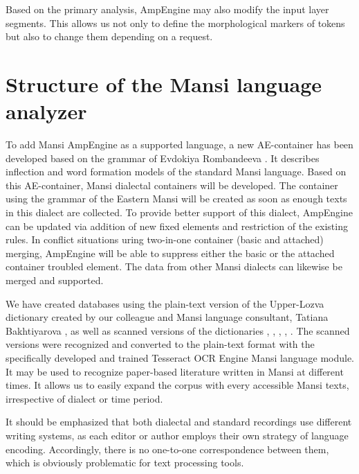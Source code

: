 \documentclass[b5paper,notitlepage]{article}
\begin{document}
Based on the primary analysis, AmpEngine may also modify the input layer segments. This allows us not only to define the morphological markers of tokens but also to change them depending on a request.


\section{Structure of the Mansi language analyzer}

To add Mansi AmpEngine as a supported language, a new AE-container has been developed  based on the grammar of Evdokiya Rombandeeva \cite{Rombandeeva vogul}. It describes inflection and word formation models of the standard Mansi language. Based on this  AE-container, Mansi dialectal containers will be developed. The container using the grammar of the Eastern Mansi \cite{Kulonen} will be created as soon as enough texts in this dialect are collected.
To provide better support of this dialect, AmpEngine can be updated via addition of new fixed elements and restriction of the existing rules. In conflict situations uring two-in-one container (basic and attached) merging, AmpEngine will be able to suppress either the basic or the attached container troubled element. The data from other Mansi dialects can likewise be merged and supported.

We have created databases using the plain-text version of the Upper-Lozva dictionary created by our colleague and Mansi language consultant, Tatiana Bakhtiyarova \cite{tanya}, as well as scanned versions of the dictionaries \cite{chernetsov}, \cite{balandin}, \cite{Rombandeeva-Kuzakova}, \cite{Munkacsi} \cite{Rombandeeva}, \cite{Kannisto}. The scanned versions were recognized and converted to the plain-text format with the specifically developed and trained Tesseract OCR Engine Mansi language module. It may be used to recognize paper-based literature written in Mansi at different times. It allows us to easily expand the corpus with every accessible Mansi texts, irrespective of dialect or time period. 

It should be emphasized that both dialectal and standard recordings use different writing systems, as each editor or author employs their own strategy of language encoding. Accordingly, there is no one-to-one correspondence between them, which is obviously problematic for text processing tools. 
\end{document}
